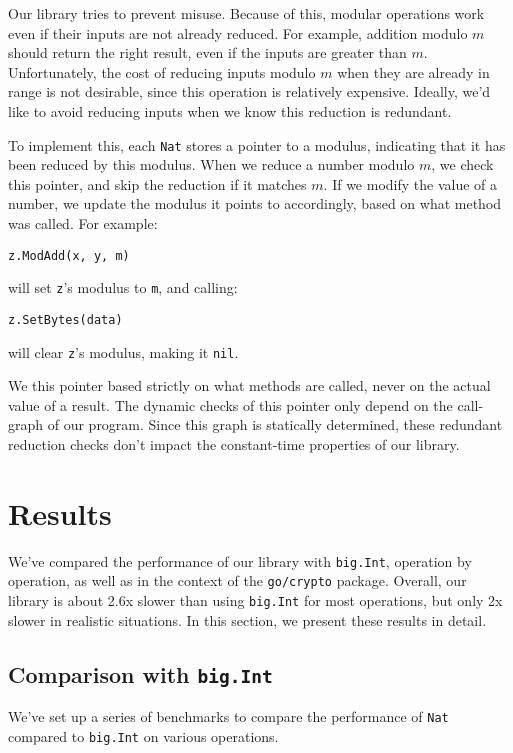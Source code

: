 \documentclass[11pt, a4paper]{article} %
\begin{document}
{Our library tries to prevent misuse. Because of this,
modular operations work even if their inputs are not already
reduced. For example, addition modulo $m$ should return the
right result, even if the inputs are greater than $m$.
Unfortunately, the cost of reducing inputs modulo $m$ when
they are already in range is not desirable, since this operation
is relatively expensive. Ideally, we'd like to avoid reducing
inputs when we know this reduction
is redundant.

To implement this, each \texttt{Nat} stores a pointer to a modulus,
indicating that it has been reduced by this modulus.
When we reduce a number modulo $m$, we check this pointer,
and skip the reduction if it matches $m$. If we modify
the value of a number, we update the modulus it points to
accordingly, based on what method was called.
For example:
\begin{verbatim}
z.ModAdd(x, y, m)
\end{verbatim}
will set \texttt{z}'s modulus to \texttt{m}, and calling:
\begin{verbatim}
z.SetBytes(data)
\end{verbatim}
will clear \texttt{z}'s modulus, making it \texttt{nil}.

We this pointer based strictly on what methods are called,
never on the actual value of a result. The dynamic
checks of this pointer only depend on the call-graph of our program.
Since this graph is statically determined, these redundant reduction
checks don't impact the constant-time properties of our library.

\section{Results}

We've compared the performance of our library
with \texttt{big.Int}, operation by operation, as well as in the
context of the \texttt{go/crypto} package.
Overall, our library is about 2.6x slower than using
\texttt{big.Int} for most operations,
but only 2x slower in realistic situations.
In this section, we
present these results in detail.

\subsection{Comparison with \texttt{big.Int}}

We've set up a series of benchmarks to compare the performance
of \texttt{Nat} compared to \texttt{big.Int} on various operations.

}
\end{document}
